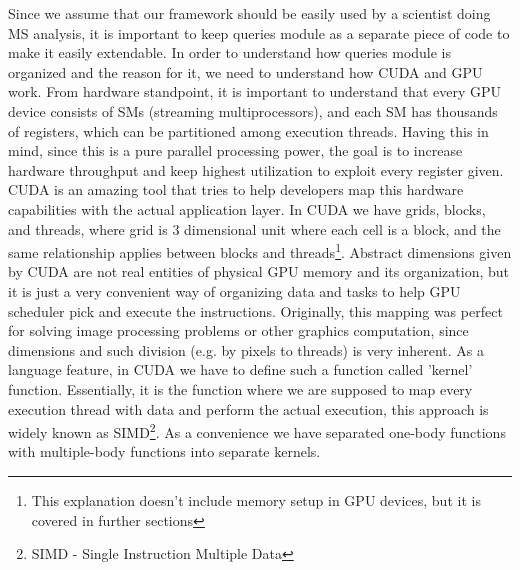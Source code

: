 \documentclass[12pt,letterpaper]{report}
\begin{document}
\noindent\hspace{3em}Since we assume that our framework should be easily used by a scientist doing MS analysis, it is important to keep queries module as a separate piece of code to make it easily extendable. In order to understand how queries module is organized and the reason for it, we need to understand how CUDA and GPU work.
\clearpage
\noindent\hspace{3em} From hardware standpoint, it is important to understand that every GPU device consists of SMs (streaming multiprocessors), and each SM has thousands of registers, which can be partitioned among execution threads. Having this in mind, since this is a pure parallel processing power, the goal is to increase hardware throughput and keep highest utilization to exploit every register given. CUDA is an amazing tool that tries to help developers map this hardware capabilities with the actual application layer. In CUDA we have grids, blocks, and threads, where grid is 3 dimensional unit where each cell is a block, and the same relationship applies between blocks and threads\footnote{This explanation doesn't include memory setup in GPU devices, but it is covered in further sections}. Abstract dimensions given by CUDA are not real entities of physical GPU memory and its organization, but it is just a very convenient way of organizing data and tasks to help GPU scheduler pick and execute the instructions. Originally, this mapping was perfect for solving image processing problems or other graphics computation, since dimensions and such division (e.g. by pixels to threads) is very inherent. As a language feature, in CUDA we have to define such a function called 'kernel' function. Essentially, it is the function where we are supposed to map every execution thread with data and perform the actual execution, this approach is widely known as SIMD\footnote{SIMD - Single Instruction Multiple Data}. As a convenience we have separated one-body functions with multiple-body functions into separate kernels.
\end{document}

